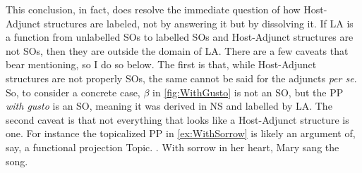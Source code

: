 \documentclass[MilwayThesis]{subfiles}
\begin{document}
This conclusion, in fact, does resolve the immediate question of how Host-Adjunct structures are labeled, not by answering it but by dissolving it.
If LA is a function from unlabelled SOs to labelled SOs and Host-Adjunct structures are not SOs, then they are outside the domain of LA.
There are a few caveats that bear mentioning, so I do so below.
The first is that, while Host-Adjunct structures are not properly SOs, the same cannot be said for the adjuncts \textit{per se}.
So, to consider a concrete case, $\beta$ in \cref{fig:WithGusto} is not an SO, but the PP \textit{with gusto} is an SO, meaning it was derived in NS and labelled by LA.
The second caveat is that not everything that looks like a Host-Adjunct structure is one.
For instance the topicalized PP in \cref{ex:WithSorrow} is likely an argument of, say, a functional projection Topic.
\ex.\label{ex:WithSorrow} With sorrow in her heart, Mary sang the song.
\end{document}
